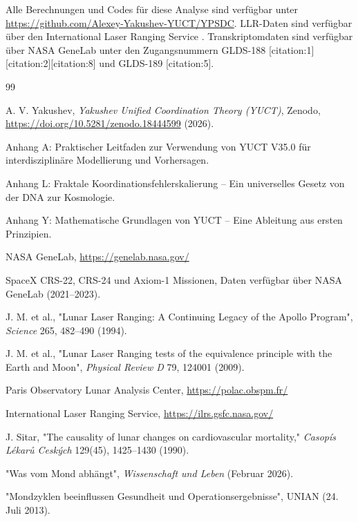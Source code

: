 \documentclass[12pt,a4paper]{article}
\theoremstyle{remark}
\begin{document}
	Alle Berechnungen und Codes für diese Analyse sind verfügbar unter \url{https://github.com/Alexey-Yakushev-YUCT/YPSDC}. LLR-Daten sind verfügbar über den International Laser Ranging Service \cite{ILRS}. Transkriptomdaten sind verfügbar über NASA GeneLab \cite{NASA-GeneLab} unter den Zugangsnummern GLDS-188 [citation:1][citation:2][citation:8] und GLDS-189 [citation:5].
	
	\begin{thebibliography}{99}
		
		A. V. Yakushev, \emph{Yakushev Unified Coordination Theory (YUCT)}, Zenodo, \url{https://doi.org/10.5281/zenodo.18444599} (2026).
		
		Anhang A: Praktischer Leitfaden zur Verwendung von YUCT V35.0 für interdisziplinäre Modellierung und Vorhersagen.
		
		Anhang L: Fraktale Koordinationsfehlerskalierung – Ein universelles Gesetz von der DNA zur Kosmologie.
		
		Anhang Y: Mathematische Grundlagen von YUCT – Eine Ableitung aus ersten Prinzipien.
		
		NASA GeneLab, \url{https://genelab.nasa.gov/}
		
		SpaceX CRS-22, CRS-24 und Axiom-1 Missionen, Daten verfügbar über NASA GeneLab (2021–2023).
		
		J. M. et al., "Lunar Laser Ranging: A Continuing Legacy of the Apollo Program", \emph{Science} 265, 482–490 (1994).
		
		J. M. et al., "Lunar Laser Ranging tests of the equivalence principle with the Earth and Moon", \emph{Physical Review D} 79, 124001 (2009).
		
		Paris Observatory Lunar Analysis Center, \url{https://polac.obspm.fr/}
		
		International Laser Ranging Service, \url{https://ilrs.gsfc.nasa.gov/}
		
		J. Sitar, "The causality of lunar changes on cardiovascular mortality," \emph{Casopís Lékarů Ceských} 129(45), 1425–1430 (1990).
		
		"Was vom Mond abhängt", \emph{Wissenschaft und Leben} (Februar 2026).
		
		"Mondzyklen beeinflussen Gesundheit und Operationsergebnisse", UNIAN (24. Juli 2013).
		

\end{thebibliography}
\end{document}
